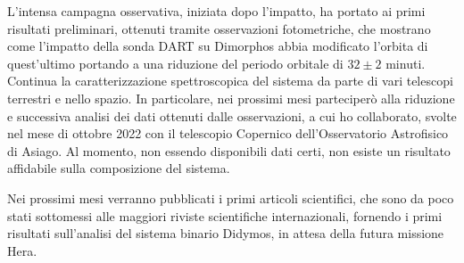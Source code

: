 L'intensa campagna osservativa, iniziata dopo l'impatto, ha portato ai primi risultati preliminari, ottenuti tramite osservazioni fotometriche, che mostrano come l'impatto della sonda DART su Dimorphos abbia modificato l'orbita di quest'ultimo portando a una riduzione del periodo orbitale di $32 \pm 2$ minuti.\\
Continua la caratterizzazione spettroscopica del sistema da parte di vari telescopi terrestri e nello spazio. In particolare, nei prossimi mesi parteciperò alla riduzione e successiva analisi dei dati ottenuti dalle osservazioni, a cui ho collaborato, svolte nel mese di ottobre 2022 con il telescopio Copernico dell'Osservatorio Astrofisico di Asiago. Al momento, non essendo disponibili dati certi, non esiste un risultato affidabile sulla composizione del sistema. 

Nei prossimi mesi verranno pubblicati i primi articoli scientifici, che sono da poco stati sottomessi alle maggiori riviste scientifiche internazionali, fornendo i primi risultati sull'analisi del sistema binario Didymos, in attesa della futura missione Hera.








\cleardoublepage
{}
\printbibliography



